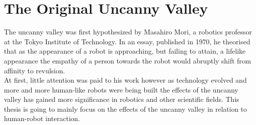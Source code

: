 \chapter{The Original Uncanny Valley}
The uncanny valley was first hypothesized by Masahiro Mori, a robotics professor at the
Tokyo Institute of Technology. In an essay, published in 1970, he theorised that as the appearance of a robot 
is approaching, but failing to attain, a lifelike appearance the empathy of a person towards the robot would 
abruptly shift from affinity to revulsion.\\
At first, little attention was paid to his work however as technology evolved and more and more human-like robots were being
built the effects of the uncanny valley has gained more significance in robotics and other scientific fields. 
This thesis is going to mainly focus on the effects of the uncanny valley in relation to human-robot interaction. \cite{original_masahiro}

